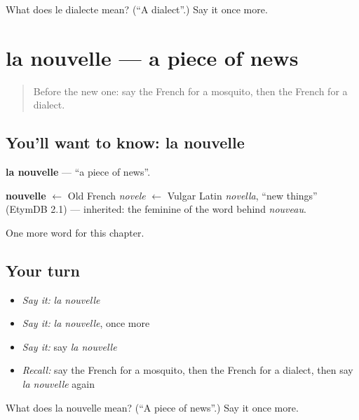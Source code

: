 \begin{tcolorbox}[breakable,colback=teal!4,colframe=teal!35!black,title={Before you move on}]
What does le dialecte mean? (\textquotedblleft{}A dialect\textquotedblright{}.) Say it once more.
\end{tcolorbox}
\section[la nouvelle]{la nouvelle — a piece of news}

\label{lesson:FR-C195-nouvelle}



\begin{quote}
Before the new one: say the French for a mosquito, then the French for a dialect.
\end{quote}

\subsection*{You'll want to know: la nouvelle}
\textbf{la nouvelle} — \textquotedblleft{}a piece of news\textquotedblright{}.

\begin{cousinweb}
\textbf{nouvelle} $\leftarrow$ Old French \emph{novele} $\leftarrow$ Vulgar Latin \emph{novella}, \textquotedblleft{}new things\textquotedblright{} (EtymDB 2.1) — inherited: the feminine of the word behind \emph{nouveau}.
\end{cousinweb}

\begin{grammarlens}[title={What you've built}]
One more word for this chapter.
\end{grammarlens}

\subsection*{Your turn}
\begin{itemize}
\raggedright
  \item \emph{Say it:} \emph{la nouvelle}
  \item \emph{Say it:} \emph{la nouvelle}, once more
  \item \emph{Say it:} say \emph{la nouvelle}
  \item \emph{Recall:} say the French for a mosquito, then the French for a dialect, then say \emph{la nouvelle} again
\end{itemize}

\begin{tcolorbox}[breakable,colback=teal!4,colframe=teal!35!black,title={Before you move on}]
What does la nouvelle mean? (\textquotedblleft{}A piece of news\textquotedblright{}.) Say it once more.
\end{tcolorbox}
